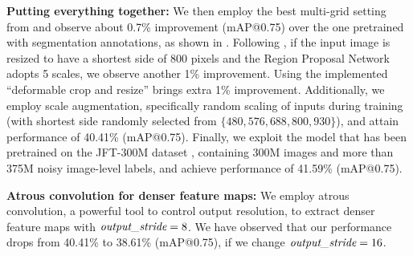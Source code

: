 \textbf{Putting everything together:} We then employ the best multi-grid setting from  and observe about 0.7\% improvement (mAP@0.75) over the one pretrained with segmentation annotations, as shown in . Following \cite{lin2016feature, he2017mask}, if the input image is resized to have a shortest side of 800 pixels and the Region Proposal Network adopts 5 scales, we observe another 1\% improvement. Using the implemented ``deformable crop and resize'' brings extra 1\% improvement. Additionally, we employ scale augmentation, specifically random scaling of inputs during training (with shortest side randomly selected from $\{480, 576, 688, 800, 930\}$), and attain performance of 40.41\% (mAP@0.75). Finally, we exploit the model that has been pretrained on the JFT-300M dataset \cite{hinton2015distilling, chollet2016xception, sun2017revisiting}, containing 300M images and more than 375M noisy image-level labels, and achieve performance of 41.59\% (mAP@0.75). 

\textbf{Atrous convolution for denser feature maps:} We employ atrous convolution, a powerful tool to control output resolution, to extract denser feature maps with $\emph{output\_stride}=8$. We have observed that our performance drops from 40.41\% to 38.61\% (mAP@0.75), if we change $\emph{output\_stride}=16$.

